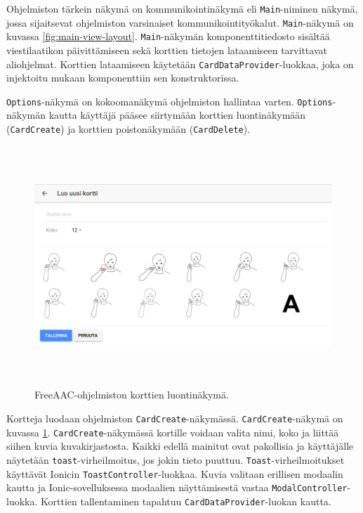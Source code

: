 \documentclass[utf8]{gradu3}
\begin{document}
Ohjelmiston tärkein näkymä on kommunikointinäkymä eli \texttt{Main}-niminen näkymä, jossa sijaitsevat ohjelmiston varsinaiset kommunikointityökalut. \texttt{Main}-näkymä on kuvassa \ref{fig:main-view-layout}. \texttt{Main}-näkymän komponenttitiedosto sisältää viestilaatikon päivittämiseen sekä korttien tietojen lataamiseen tarvittavat aliohjelmat. Korttien lataamiseen käytetään \texttt{CardDataProvider}-luokkaa, joka on injektoitu mukaan komponenttiin sen konstruktorissa.

\texttt{Options}-näkymä on kokoomanäkymä ohjelmiston hallintaa varten. \texttt{Options}-näkymän kautta käyttäjä pääsee siirtymään korttien luontinäkymään (\texttt{CardCreate}) ja korttien poistonäkymään (\texttt{CardDelete}).

\begin{figure}[h]\centering
  \includegraphics[height=9cm,keepaspectratio]{card-create-layout}
  \caption[FreeAAC-ohjelmiston korttien luontinäkymä.]
  {FreeAAC-ohjelmiston korttien luontinäkymä.}
  \label{fig:card-create-layout}
\end{figure}

Kortteja luodaan ohjelmiston \texttt{CardCreate}-näkymässä. \texttt{CardCreate}-näkymä on kuvassa \ref{fig:card-create-layout}. \texttt{CardCreate}-näkymässä kortille voidaan valita nimi, koko ja liittää siihen kuvia kuvakirjastosta. Kaikki edellä mainitut ovat pakollisia ja käyttäjälle näytetään \texttt{toast}-virheilmoitus, jos jokin tieto puuttuu. \texttt{Toast}-virheilmoitukset käyttävät Ionicin \texttt{ToastController}-luokkaa. Kuvia valitaan erillisen modaalin kautta ja Ionic-sovelluksessa modaalien näyttämisestä vastaa \texttt{ModalController}-luokka. Korttien tallentaminen tapahtuu \texttt{CardDataProvider}-luokan kautta.
\end{document}
